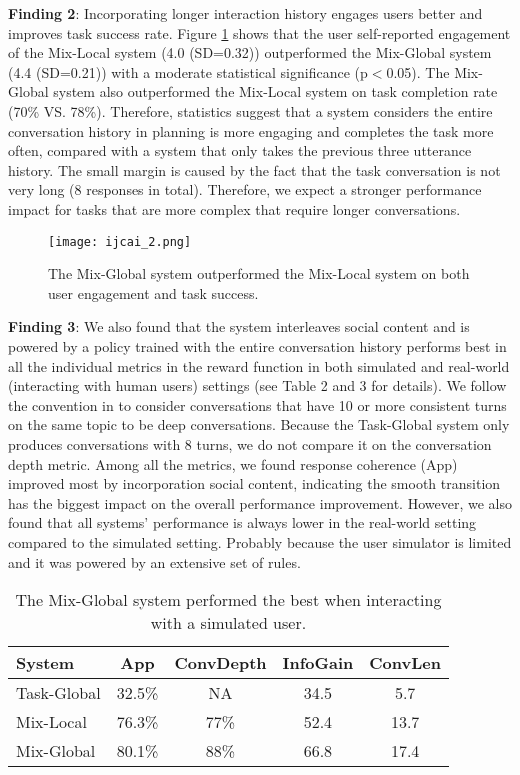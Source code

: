 \documentclass[11pt]{article}
\newcommand{\dk}[1]{{\color{red} #1}}
\begin{document}
\noindent\textbf{Finding 2}: Incorporating longer interaction history engages users better and improves task success rate. Figure \ref{fig:ijcai2} shows that the user self-reported engagement of the Mix-Local system (4.0 (SD=0.32)) outperformed the Mix-Global system (4.4 (SD=0.21)) with a moderate statistical significance (p$<$0.05). The Mix-Global system also outperformed the Mix-Local system on task completion rate (70\% VS. 78\%). Therefore, statistics suggest that a system considers the entire conversation history in planning is more engaging and completes the task more often, compared with a system that only takes the previous three utterance history. The small margin is caused by the fact that the task conversation is not very long (8 responses in total). Therefore, we expect a stronger performance impact for tasks that are more complex that require longer conversations.  \\

\begin{figure}[htb]
\centering
\graphicspath{ {figures/} }
\texttt{[image: ijcai\_2.png]}
\caption{The Mix-Global system outperformed the Mix-Local system on both user engagement and task success.}
\label{fig:ijcai2}       
\end{figure}


\noindent\textbf{Finding 3}: We also found that the system interleaves social content and is powered by a policy trained with the entire conversation history performs best in all the individual metrics in the reward function in both simulated and real-world (interacting with human users) settings (see Table 2 and 3 for details). We follow the convention in \cite{yu2016sigdial} to consider conversations that have 10 or more consistent turns on the same topic to be deep conversations. Because the Task-Global system only produces conversations with 8 turns, we do not compare it on the conversation depth metric. Among all the metrics, we found response coherence (App) improved most by incorporation social content, indicating the smooth transition has the biggest impact on the overall performance improvement. However, we also found that all systems' performance is always lower in the real-world setting compared to the simulated setting. Probably because the user simulator is limited and it was powered by an extensive set of rules.  %


 \begin{table}[htbp]
 \centering
    \begin{tabular}{l|cccc}
    \hline
    System& App & ConvDepth & InfoGain & ConvLen\\
    \hline
    Task-Global & 32.5\% & NA & 34.5 & 5.7\\
    \hline
    Mix-Local & 76.3\% & 77\% & 52.4 & 13.7\\
    \hline
    Mix-Global & 80.1\% & 88\% & 66.8 & 17.4\\
    \hline
    \end{tabular}
    \caption{The Mix-Global system performed the best when interacting with a simulated user.}
    \label{simulate}
\end{table}
\end{document}
